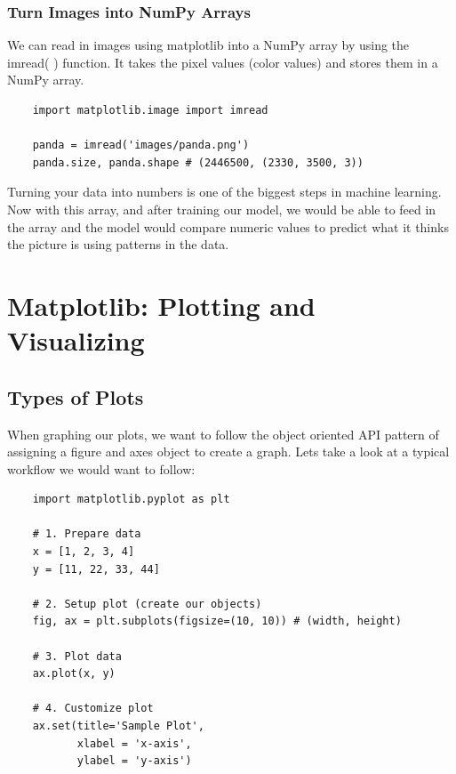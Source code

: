 \documentclass[11pt, a4paper]{article}
\begin{document}
\begin{spacing}{1.1}
	\subsubsection{Turn Images into NumPy Arrays}
	We can read in images using matplotlib into a NumPy array by using the imread( ) function. It takes the pixel values (color values) and stores them in a NumPy array. 
	\begin{lstlisting}
	import matplotlib.image import imread
	
	panda = imread('images/panda.png') 
	panda.size, panda.shape # (2446500, (2330, 3500, 3)) \end{lstlisting} \vspace*{1mm} 
	Turning your data into numbers is one of the biggest steps in machine learning. Now with this array, and after training our model, we would be able to feed in the array and the model would compare numeric values to predict what it thinks the picture is using patterns in the data. \newpage

	\section{Matplotlib: Plotting and Visualizing}
	\subsection{Types of Plots}
	When graphing our plots, we want to follow the object oriented API pattern of assigning a figure and axes object to create a graph. Lets take a look at a typical workflow we would want to follow:
	\begin{lstlisting}
	import matplotlib.pyplot as plt
	
	# 1. Prepare data
	x = [1, 2, 3, 4]
	y = [11, 22, 33, 44]
	
	# 2. Setup plot (create our objects)
	fig, ax = plt.subplots(figsize=(10, 10)) # (width, height)
	
	# 3. Plot data
	ax.plot(x, y)
	
	# 4. Customize plot
	ax.set(title='Sample Plot',
	       xlabel = 'x-axis',
	       ylabel = 'y-axis')
	       

\end{lstlisting}
\end{spacing}
\end{document}
